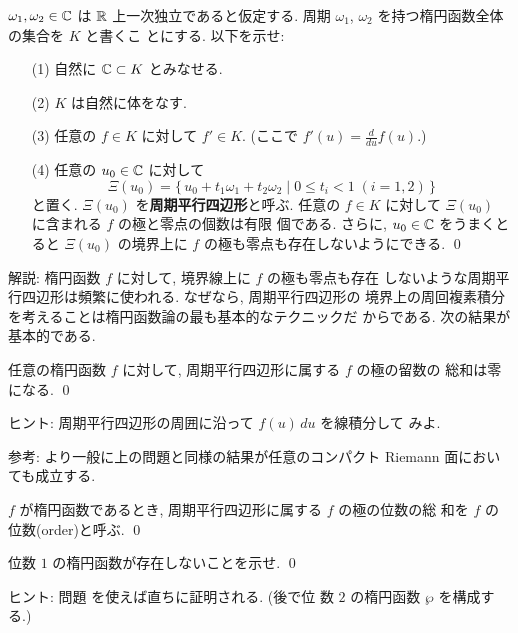 \documentclass[12pt,twoside]{jarticle}
\def\pe{\wp}
\def\R{{\Bbb R}} %
\def\C{{\Bbb C}} %
\def\od#1#2{\frac{d #1}{d #2}}
\begin{document}
\begin{question}\label{q:ef2}\qstar{*}
  $\omega_1,\omega_2\in\C$ は $\R$ 上一次独立であると仮定する. 
  周期 $\omega_1$, $\omega_2$ を持つ楕円函数全体の集合を $K$ と書くこ
  とにする. 以下を示せ:
  \begin{enumerate}
  \item[(1)] 自然に $\C\subset K$ とみなせる.
  \item[(2)] $K$ は自然に体をなす.
  \item[(3)] 任意の $f\in K$ に対して $f'\in K$. %
    (ここで $f'(u) = \od{}{u}f(u)$.)
  \item[(4)] 任意の $u_0\in\C$ に対して
    \[
      \Xi(u_0) = 
      \{\,u_0 + t_1 \omega_1 + t_2 \omega_2 \mid 
        0\le t_i < 1 \; (i=1,2)\,\}
    \] %
    と置く. $\Xi(u_0)$ を{\bf 周期平行四辺形}と呼ぶ. 任意の %
    $f\in K$ に対して $\Xi(u_0)$ に含まれる $f$ の極と零点の個数は有限
    個である. さらに, $u_0\in\C$ をうまくとると $\Xi(u_0)$ の境界上に 
    $f$ の極も零点も存在しないようにできる.  \qed
  \end{enumerate}
\end{question}

\noindent 解説: 楕円函数 $f$ に対して, 境界線上に $f$ の極も零点も存在
しないような周期平行四辺形は頻繁に使われる. なぜなら, 周期平行四辺形の
境界上の周回複素積分を考えることは楕円函数論の最も基本的なテクニックだ
からである. 次の結果が基本的である.

\begin{question}[留数定理]\label{q:ef3}\qstar{*}
  任意の楕円函数 $f$ に対して, 周期平行四辺形に属する $f$ の極の留数の
  総和は零になる. \qed
\end{question}

\noindent ヒント: 周期平行四辺形の周囲に沿って $f(u)\,du$ を線積分して
みよ.

\medskip

\noindent 参考: より一般に上の問題と同様の結果が任意のコンパクト 
Riemann 面においても成立する.


\begin{Definition}[楕円函数の位数の定義]
  $f$ が楕円函数であるとき, 周期平行四辺形に属する $f$ の極の位数の総
  和を $f$ の位数(order)と呼ぶ. \qed
\end{Definition}

\begin{question}\label{q:ef4}\qstar{*}
  位数 $1$ の楕円函数が存在しないことを示せ. \qed
\end{question}

\noindent ヒント: 問題  を使えば直ちに証明される. (後で位
数 $2$ の楕円函数 $\pe$ を構成する.)
\end{document}
